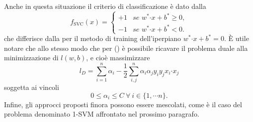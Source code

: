 \documentclass [11pt,a4paper,twoside,openright] {book}
\begin{document}
\noindent
Anche in questa situazione il criterio di classificazione è dato dalla
\begin{equation}
f_\mathrm{SVC}(x)=
\begin{cases}
+1 & \textit{se } w^* \boldsymbol{\cdot} x + b^* \geq 0, \\
-1 & \textit{se } w^* \boldsymbol{\cdot} x  + b^*< 0.
\end{cases}
\end{equation}
che differisce dalla  per il metodo di training dell'iperpiano $w^* \boldsymbol{\cdot} x + b^* = 0$.
È utile notare che allo stesso modo che per () è possibile ricavare il problema duale alla minimizzazione di $l(w,b)$, e cioè massimizzare
\begin{equation}\label{lossduale}
l_D = \sum_{i=1}^n \alpha_i -\dfrac{1}{2} \sum_{i,j}^n \alpha_i \alpha_j y_i y_j x_i \boldsymbol{\cdot} x_j
\end{equation}
soggetta ai vincoli
\begin{equation}
0 \leq \alpha_i \leq C \: \forall \: i \in \lbrace 1, \cdots n \rbrace.
\end{equation}
Infine, gli approcci proposti finora possono essere mescolati, come è il caso del problema denominato 1-SVM affrontato nel prossimo paragrafo.
\end{document}
